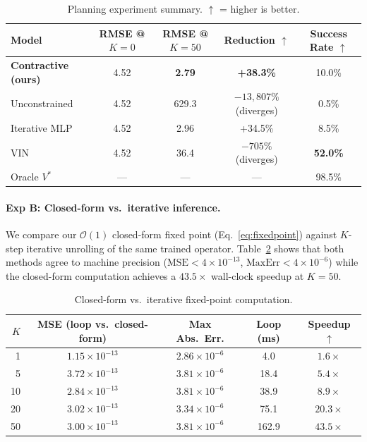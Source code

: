 \documentclass{article}
\begin{document}
\begin{table}[t]
  \centering
  \caption{Planning experiment summary. $\uparrow$ = higher is better.}
  \label{tab:planning}
  \small
  \begin{tabular}{lcccc}
    \toprule
    Model & RMSE @ $K\!=\!0$ & RMSE @ $K\!=\!50$ & Reduction $\uparrow$ & Success Rate $\uparrow$ \\
    \midrule
    \textbf{Contractive (ours)} & 4.52 & \textbf{2.79} & \textbf{+38.3\%} & 10.0\% \\
    Unconstrained               & 4.52 & 629.3         & $-13{,}807\%$ (diverges) & 0.5\% \\
    Iterative MLP               & 4.52 & 2.96          & +34.5\%        & 8.5\% \\
    VIN~\citep{tamar2016value}  & 4.52 & 36.4          & $-705\%$ (diverges) & \textbf{52.0\%} \\
    Oracle $V^*$                & ---  & ---           & ---             & 98.5\% \\
    \bottomrule
  \end{tabular}
\end{table}

\paragraph{Exp B: Closed-form vs.\ iterative inference.}
We compare our $\mathcal{O}(1)$ closed-form fixed point (Eq.~\ref{eq:fixedpoint})
against $K$-step iterative unrolling of the same trained operator.
Table~\ref{tab:speedup} shows that both methods agree to machine precision
($\text{MSE} < 4\times10^{-13}$, $\text{MaxErr} < 4\times10^{-6}$) while the
closed-form computation achieves a $\mathbf{43.5\times}$ wall-clock speedup at
$K=50$.

\begin{table}[h]
  \centering
  \caption{Closed-form vs.\ iterative fixed-point computation.}
  \label{tab:speedup}
  \small
  \begin{tabular}{rcccc}
    \toprule
    $K$ & MSE (loop vs.\ closed-form) & Max Abs.\ Err. & Loop (ms) & Speedup $\uparrow$ \\
    \midrule
     1  & $1.15\times10^{-13}$ & $2.86\times10^{-6}$ &   4.0  & $1.6\times$ \\
     5  & $3.72\times10^{-13}$ & $3.81\times10^{-6}$ &  18.4  & $5.4\times$ \\
    10  & $2.84\times10^{-13}$ & $3.81\times10^{-6}$ &  38.9  & $8.9\times$ \\
    20  & $3.02\times10^{-13}$ & $3.34\times10^{-6}$ &  75.1  & $20.3\times$ \\
    50  & $3.00\times10^{-13}$ & $3.81\times10^{-6}$ & 162.9  & $\mathbf{43.5\times}$ \\
    \bottomrule
  \end{tabular}
\end{table}
\end{document}
